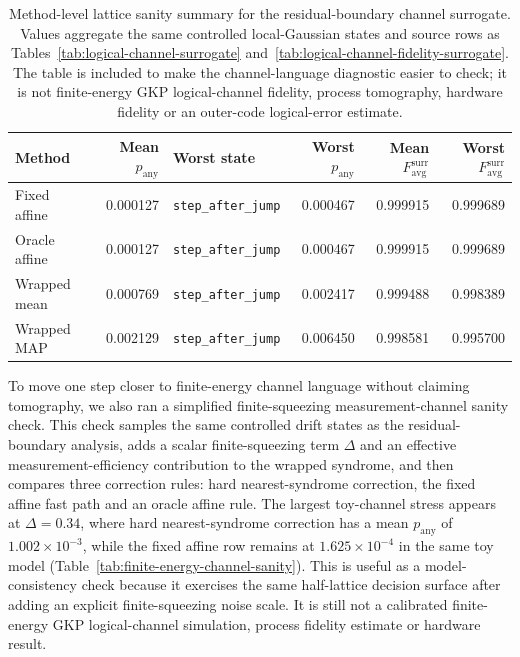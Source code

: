 \documentclass[11pt]{article}
\begin{document}
\begin{table}[t]
\centering
\small
\begin{tabular}{@{}lrlrrr@{}}
\toprule
Method & Mean \(p_{\mathrm{any}}\) & Worst state & Worst \(p_{\mathrm{any}}\) & Mean \(F_{\mathrm{avg}}^{\mathrm{surr}}\) & Worst \(F_{\mathrm{avg}}^{\mathrm{surr}}\) \\
\midrule
Fixed affine & 0.000127 & \texttt{step\_after\_jump} & 0.000467 & 0.999915 & 0.999689 \\
Oracle affine & 0.000127 & \texttt{step\_after\_jump} & 0.000467 & 0.999915 & 0.999689 \\
Wrapped mean & 0.000769 & \texttt{step\_after\_jump} & 0.002417 & 0.999488 & 0.998389 \\
Wrapped MAP & 0.002129 & \texttt{step\_after\_jump} & 0.006450 & 0.998581 & 0.995700 \\
\bottomrule
\end{tabular}
\caption{Method-level lattice sanity summary for the residual-boundary channel
surrogate.  Values aggregate the same controlled local-Gaussian states and
source rows as Tables~\ref{tab:logical-channel-surrogate}
and~\ref{tab:logical-channel-fidelity-surrogate}.  The table is included to
make the channel-language diagnostic easier to check; it is not finite-energy GKP
logical-channel fidelity, process tomography, hardware fidelity or an
outer-code logical-error estimate.}
\label{tab:lattice-logical-channel-sanity}
\end{table}

To move one step closer to finite-energy channel language without claiming
tomography, we also ran a simplified finite-squeezing measurement-channel
sanity check.  This check samples the same controlled drift states as the
residual-boundary analysis, adds a scalar finite-squeezing term \(\Delta\) and
an effective measurement-efficiency contribution to the wrapped syndrome, and
then compares three correction rules: hard nearest-syndrome correction, the
fixed affine fast path and an oracle affine rule.  The largest toy-channel
stress appears at \(\Delta=0.34\), where hard nearest-syndrome correction has a
mean \(p_{\mathrm{any}}\) of \(1.002\times10^{-3}\), while the fixed affine row
remains at \(1.625\times10^{-4}\) in the same toy model
(Table~\ref{tab:finite-energy-channel-sanity}).  This is useful as a
model-consistency check because it exercises the same half-lattice decision
surface after adding an explicit finite-squeezing noise scale.  It is still not
a calibrated finite-energy GKP logical-channel simulation, process fidelity
estimate or hardware result.
\end{document}
